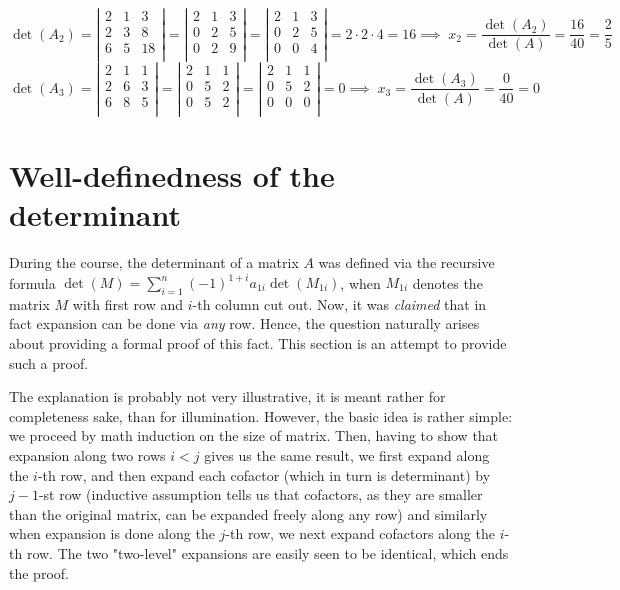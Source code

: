 \documentclass[8pt]{article} %
\begin{document}
\begin{myeg}
\[\det(A_2)=\left|\begin{array}{rrr}2&1&3\\2&3&8\\6&5&18\\
\end{array}\right|=
\left|\begin{array}{rrr}
	2&1&3\\0&2&5\\0&2&9\\
\end{array}\right|=
\left|\begin{array}{rrr}
	2&1&3\\0&2&5\\0&0&4\\
\end{array}\right|=2\cdot2\cdot4=16
	\implies\;x_2=\frac{\det(A_2)}{\det(A)}=\frac{16}{40}=\frac{2}{5}\]
\[\det(A_3)=
\left|\begin{array}{rrr}
2&1&1\\
2&6&3\\
6&8&5\\
\end{array}\right|=
\left|\begin{array}{rrr}
2&1&1\\
0&5&2\\
0&5&2\\
\end{array}\right|=
\left|\begin{array}{rrr}
2&1&1\\
0&5&2\\
0&0&0\\
\end{array}\right|=0
	\implies\;x_3=\frac{\det(A_3)}{\det(A)}=\frac{0}{40}=0\]
\end{myeg}
\section{Well-definedness of the determinant}
During the course, the determinant of a matrix $A$ was defined via the recursive formula $\det(M)=\sum_{i=1}^n(-1)^{1+i}a_{1i}\det(M_{1i})$,
when $M_{1i}$ denotes the matrix $M$ with first row and $i$-th column cut out. Now, it was \textit{claimed} that in fact expansion
can be done via \textit{any} row. Hence, the question naturally arises about providing a formal proof of this fact. This section
is an attempt to provide such a proof. 

The explanation is probably not very illustrative, it is meant rather for completeness sake, than for illumination. However, the basic idea
is rather simple: we proceed by math induction on the size of matrix. Then, having to show that expansion along two rows $i<j$ gives us the same
result, we first expand along the $i$-th row, and then expand each cofactor (which in turn is determinant) by $j-1$-st row (inductive assumption
tells us that cofactors, as they are smaller than the original matrix, can be expanded freely along any row) and similarly when
expansion is done along the $j$-th row, we next expand cofactors along the $i$-th row. The two "two-level" expansions are easily seen to be
identical, which ends the proof.
\end{document}
